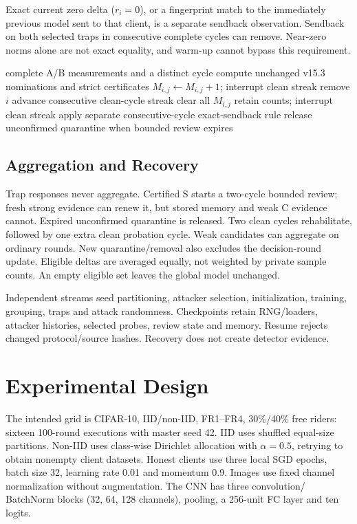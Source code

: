 \documentclass[conference]{IEEEtran}
\begin{document}
Exact current zero delta ($r_i=0$), or a fingerprint match to the immediately
previous model sent to that client, is a separate sendback observation. Sendback
on both selected traps in consecutive complete cycles can remove. Near-zero
norms alone are not exact equality, and warm-up cannot bypass this requirement.

\begin{algorithm}[t]
\caption{Component-specific fresh-certificate confirmation}
\begin{algorithmic}[1]
\Require complete A/B measurements and a distinct cycle
\State compute unchanged v15.3 nominations and strict certificates
  \State $M_{i,j}\gets M_{i,j}+1$; interrupt clean streak
   \State remove $i$ \EndIf
  \State advance consecutive clean-cycle streak
   \State clear all $M_{i,j}$ \EndIf
 \Else \State retain counts; interrupt clean streak
 \EndIf
 \State apply separate consecutive-cycle exact-sendback rule
\EndFor
\State release unconfirmed quarantine when bounded review expires
\end{algorithmic}
\end{algorithm}

\subsection{Aggregation and Recovery}
Trap responses never aggregate. Certified S starts a two-cycle bounded review;
fresh strong evidence can renew it, but stored memory and weak C evidence cannot.
Expired unconfirmed quarantine is released. Two clean cycles rehabilitate,
followed by one extra clean probation cycle. Weak candidates can aggregate on
ordinary rounds. New quarantine/removal also excludes the decision-round update.
Eligible deltas are averaged equally, not weighted by private sample counts.
An empty eligible set leaves the global model unchanged.

Independent streams seed partitioning, attacker selection, initialization,
training, grouping, traps and attack randomness. Checkpoints retain RNG/loaders,
attacker histories, selected probes, review state and memory. Resume rejects
changed protocol/source hashes. Recovery does not create detector evidence.

\section{Experimental Design}
The intended grid is CIFAR-10, IID/non-IID, FR1--FR4, 30\%/40\% free riders:
sixteen 100-round executions with master seed 42. IID uses shuffled equal-size
partitions. Non-IID uses class-wise Dirichlet allocation with $\alpha=0.5$,
retrying to obtain nonempty client datasets. Honest clients use three local SGD
epochs, batch size 32, learning rate 0.01 and momentum 0.9. Images use fixed
channel normalization without augmentation. The CNN has three convolution/
BatchNorm blocks (32, 64, 128 channels), pooling, a 256-unit FC layer and ten logits.
\end{document}
